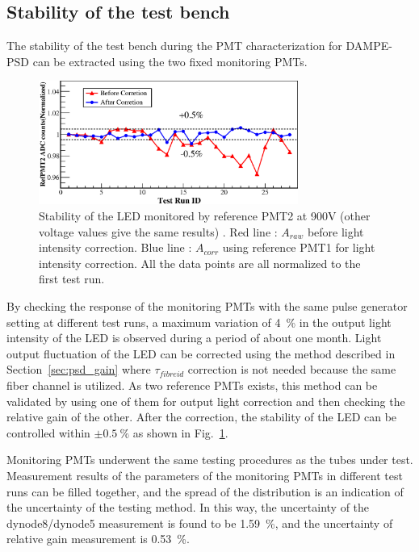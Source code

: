 \documentclass{nst}
\begin{document}
\subsection{Stability of the test bench}
\label{sec:stability}

The stability of the test bench during the PMT characterization for DAMPE-PSD can be extracted using the two fixed monitoring PMTs.

\begin{figure}[!htb]
	\centering
	\includegraphics[width=85mm]{FIG8}
	\caption{Stability of the LED monitored by reference PMT2 at 900V (other voltage values give the same results) . Red line : $A_{raw}$ before light intensity correction. Blue line : $A_{corr}$ using reference PMT1 for light intensity correction. All the data points are all normalized to the first test run.}
	\label{fig:FIG8}
\end{figure} 

By checking the response of the monitoring PMTs with the same pulse generator setting at different test runs, a maximum variation of \SI{4}{\percent} in the output light intensity of the LED is observed during a period of about one month.
Light output fluctuation of the LED can be corrected using the method described in Section~\ref{sec:psd_gain} where $\tau_{fibreid}$ correction is not needed because the same fiber channel is utilized.
As two reference PMTs exists, this method can be validated by using one of them for output light correction and then checking the relative gain of the other. 
After the correction, the stability of the LED can be controlled within $\pm\SI{0.5}{\percent}$ as shown in Fig.~\ref{fig:FIG8}.

Monitoring PMTs underwent the same testing procedures as the tubes under test.
Measurement results of the parameters of the monitoring PMTs in different test runs can be filled together, and the spread of the distribution is an indication of the uncertainty of the testing method.
In this way, the uncertainty of the dynode8/dynode5 measurement is found to be \SI{1.59}{\percent}, and the uncertainty of relative gain measurement is \SI{0.53}{\percent}. 
	
\end{document}
